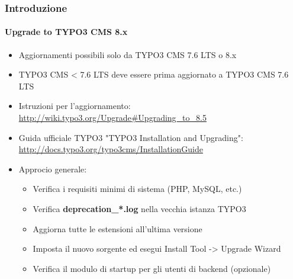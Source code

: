 \begin{frame}[fragile]
	\frametitle{Introduzione}
	\framesubtitle{Upgrade to TYPO3 CMS 8.x}

	\begin{itemize}
		\item Aggiornamenti possibili solo da TYPO3 CMS 7.6 LTS o 8.x
		\item TYPO3 CMS < 7.6 LTS deve essere prima aggiornato a TYPO3 CMS 7.6 LTS
	\end{itemize}

	\begin{itemize}

		\item Istruzioni per l'aggiornamento:\newline
			\smaller\url{http://wiki.typo3.org/Upgrade#Upgrading_to_8.5}\normalsize
		\item Guida ufficiale TYPO3 "TYPO3 Installation and Upgrading":
			\smaller\url{http://docs.typo3.org/typo3cms/InstallationGuide}\normalsize
		\item Approcio generale:
			\begin{itemize}
				\item Verifica i requisiti minimi di sistema \small(PHP, MySQL, etc.)
				\item Verifica \textbf{deprecation\_*.log} nella vecchia istanza TYPO3
				\item Aggiorna tutte le estensioni all'ultima versione
				\item Imposta il nuovo sorgente ed esegui Install Tool -> Upgrade Wizard
				\item Verifica il modulo di startup per gli utenti di backend (opzionale)
			\end{itemize}
	\end{itemize}

\end{frame}


